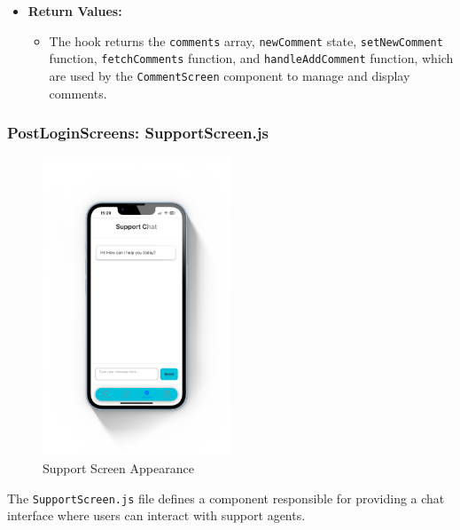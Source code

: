 \begin{itemize}
    \item \textbf{Return Values:}
    \begin{itemize}
        \item The hook returns the \texttt{comments} array, \texttt{newComment} state, \texttt{setNewComment} function, \texttt{fetchComments} function, and \texttt{handleAddComment} function, which are used by the \texttt{CommentScreen} component to manage and display comments.
    \end{itemize}
\end{itemize}

\subsubsection{PostLoginScreens: SupportScreen.js}

\begin{figure}[!ht]
    \centering
    \includegraphics[width=0.5\textwidth]
    {LATEX/Appendices/Images/Software/Frontend/support_screen.png}
    \caption{Support Screen Appearance}
    \label{fig:support screen}
\end{figure}

The \texttt{SupportScreen.js} file defines a component responsible for providing a chat interface where users can interact with support agents.

